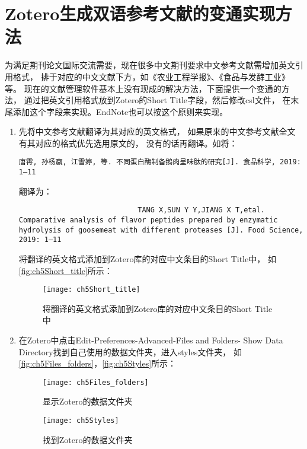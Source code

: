 \documentclass[cn,11pt,chinese]{elegantbook}
\begin{document}
		\section{Zotero生成双语参考文献的变通实现方法}\label{sec:Biolan}
				为满足期刊论文国际交流需要，现在很多中文期刊要求中文参考文献需增加英文引用格式，
				排于对应的中文文献下方，如《农业工程学报》、《食品与发酵工业》等。
				现在的文献管理软件基本上没有现成的解决方法，下面提供一个变通的方法，
				通过把英文引用格式放到Zotero的Short Title字段，然后修改csl文件，
				在末尾添加这个字段来实现。EndNote也可以按这个原则来实现。
				\begin{enumerate}
					\item 先将中文参考文献翻译为其对应的英文格式，
						如果原来的中文参考文献全文有其对应的格式优先选用原文的，
						没有的话再翻译。如将：
						\begin{lstlisting}[language=VBScript]
						唐霄, 孙杨赢, 江雪婷, 等. 不同蛋白酶制备鹅肉呈味肽的研究[J]. 食品科学, 2019: 1–11
						\end{lstlisting}
						翻译为：
						\begin{lstlisting}
							TANG X,SUN Y Y,JIANG X T,etal. Comparative analysis of flavor peptides prepared by enzymatic hydrolysis of goosemeat with different proteases [J]. Food Science, 2019: 1–11
						\end{lstlisting}
						将翻译的英文格式添加到Zotero库的对应中文条目的Short Title中，
						如\autoref{fig:ch5Short_title}所示：
						\begin{figure}[ht]
							\centering
							\texttt{[image: ch5Short\_title]}
							\caption{将翻译的英文格式添加到Zotero库的对应中文条目的Short Title中}
							\label{fig:ch5Short_title}
						\end{figure}
						\item 在Zotero中点击Edit-Preferences-Advanced-Files and Folders-
							Show Data Directory找到自己使用的数据文件夹，进入styles文件夹，
							如\autoref{fig:ch5Files_folders}，\autoref{fig:ch5Styles}所示：
							\begin{figure}[ht]
								\centering
								\texttt{[image: ch5Files\_folders]}
								\caption{显示Zotero的数据文件夹}
								\label{fig:ch5Files_folders}
							\end{figure}
							\begin{figure}[ht]
								\centering
								\texttt{[image: ch5Styles]}
								\caption{找到Zotero的数据文件夹}

\end{figure}
\end{enumerate}
\end{document}
